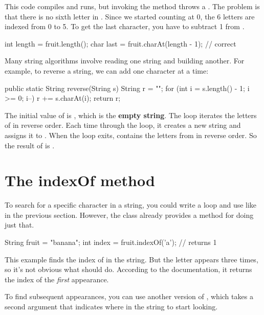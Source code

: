 This code compiles and runs, but invoking the  method throws a .
The problem is that there is no sixth letter in .
Since we started counting at 0, the 6 letters are indexed from 0 to 5.
To get the last character, you have to subtract 1 from .

\begin{code}
int length = fruit.length();
char last = fruit.charAt(length - 1);  // correct
\end{code}

Many string algorithms involve reading one string and building another.
For example, to reverse a string, we can add one character at a time:

\begin{code}
public static String reverse(String s) {
    String r = "";
    for (int i = s.length() - 1; i >= 0; i--) {
        r += s.charAt(i);
    }
    return r;
}
\end{code}


The initial value of  is , which is the {\bf empty string}.
The loop iterates the letters of  in reverse order.
Each time through the loop, it creates a new string and assigns it to .
When the loop exits,  contains the letters from  in reverse order.
So the result of  is .


\section{The indexOf method}


To search for a specific character in a string, you could write a  loop and use  like in the previous section.
However, the  class already provides a method for doing just that.

\begin{code}
String fruit = "banana";
int index = fruit.indexOf('a');     // returns 1
\end{code}

This example finds the index of  in the string.
But the letter appears three times, so it's not obvious what  should do.
According to the documentation, it returns the index of the {\em first} appearance.

To find subsequent appearances, you can use another version of , which takes a second argument that indicates where in the string to start looking.

